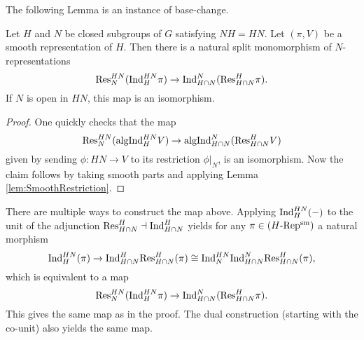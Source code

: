 \documentclass[../main.tex]{subfiles}
\begin{document}
The following Lemma is an instance of base-change.
\begin{lem}\label{lem:BaseChangeForResInd}
  Let $H$ and $N$ be closed subgroups of $G$ satisfying $NH = HN$. Let $(\pi,
  V)$ be a smooth representation of $H$.
  Then there is a natural split monomorphism of $N$-representations 
  \begin{equation*}
    \mathrm{Res}_N^{HN} (\mathrm{Ind}_H^{HN} \pi) \to \mathrm{Ind}_{H \cap N}^N(\mathrm{Res}_{H\cap N}^H \pi).
  \end{equation*}
  If $N$ is open in $HN$, this map is an isomorphism.
\begin{proof}
  One quickly checks that the map
  \begin{equation*}
    \mathrm{Res}^{HN}_{N}(\mathrm{algInd}_{H}^{HN} V) \to \mathrm{algInd}_{H\cap N}^{N}(\mathrm{Res}_{H \cap N}^H V)
  \end{equation*}
  given by sending $\phi\colon HN \to V$ to its restriction $\phi|_N$, is an
  isomorphism. Now the claim follows by taking smooth parts and applying Lemma
  \ref{lem:SmoothRestriction}.
\end{proof}
\end{lem}
\begin{rmk} 
  There are multiple ways to construct the map above.
  Applying $\mathrm{Ind}_H^{HN}(-)$ to the unit of the adjunction $\mathrm{Res}_{H\cap N}^H \dashv
  \mathrm{Ind}_{H\cap N}^H$ yields for any $\pi \in {({H}\textnormal-\allowbreak\mathrm{Rep^{\mathrm{sm}}})}$ a natural morphism
  \begin{equation*}
    \mathrm{Ind}_H^{HN}(\pi) \to \mathrm{Ind}_{H\cap N}^H \mathrm{Res}_{H \cap N}^H (\pi) \cong
    \mathrm{Ind}_{N}^{HN} \mathrm{Ind}_{H \cap N}^N \mathrm{Res}_{H \cap N}^H (\pi),
  \end{equation*}
  which is equivalent to a map 
  \begin{equation*}
    \mathrm{Res}_N^{HN} (\mathrm{Ind}_H^{HN} \pi) \to \mathrm{Ind}_{H \cap N}^N(\mathrm{Res}_{H\cap N}^H \pi).
  \end{equation*}
  This gives the same map as in the proof. The dual construction (starting with the
  co-unit) also yields the same map.
\end{rmk}
\end{document}
